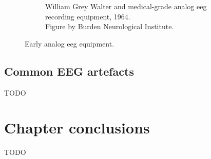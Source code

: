 \begin{figure}[ht]
\begin{minipage}{\textwidth}
\begin{subfigure}{.48\textwidth}
        \captionsetup{width=0.9\linewidth}
        \captionsetup{justification=centering}
        \caption{William Grey Walter and medical-grade analog \gls{eeg} recording equipment, 1964.\\Figure by Burden Neurological Institute\footnotemark[3].}
        \label{fig:eeg_hardware_evolution_4}
    \end{subfigure}
    \captionsetup{width=0.9\linewidth}
    \captionsetup{justification=centering}
    \caption{Early analog \gls{eeg} equipment.}
    \label{fig:eeg_hardware_early_analog}
  \end{minipage}  
\end{figure}


\subsection{Common EEG artefacts}
\label{subsec:biomedical_signals_measuring_artefacts}

TODO

\section{Chapter conclusions}
\label{sec:biomedical_signals_summary}

TODO